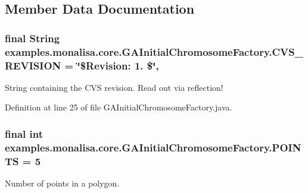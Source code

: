\subsection{Member Data Documentation}
\hypertarget{classexamples_1_1monalisa_1_1core_1_1_g_a_initial_chromosome_factory_a9fccea60730230df75e5bf5a1a209a41}{
\subsubsection[{C\-V\-S\-\_\-\-R\-E\-V\-I\-S\-I\-O\-N}]{\setlength{\rightskip}{0pt plus 5cm}final String examples.\-monalisa.\-core.\-G\-A\-Initial\-Chromosome\-Factory.\-C\-V\-S\-\_\-\-R\-E\-V\-I\-S\-I\-O\-N = \char`\"{}\$Revision\-: 1. \$\char`\"{}\hspace{0.3cm}{\ttfamily [static]}, {\ttfamily [private]}}}\label{classexamples_1_1monalisa_1_1core_1_1_g_a_initial_chromosome_factory_a9fccea60730230df75e5bf5a1a209a41}
String containing the C\-V\-S revision. Read out via reflection! 

Definition at line 25 of file G\-A\-Initial\-Chromosome\-Factory.\-java.

\hypertarget{classexamples_1_1monalisa_1_1core_1_1_g_a_initial_chromosome_factory_af72d5bfb15a860ef43323231eb3eebc2}{
\subsubsection[{P\-O\-I\-N\-T\-S}]{\setlength{\rightskip}{0pt plus 5cm}final int examples.\-monalisa.\-core.\-G\-A\-Initial\-Chromosome\-Factory.\-P\-O\-I\-N\-T\-S = 5\hspace{0.3cm}{\ttfamily [static]}}}\label{classexamples_1_1monalisa_1_1core_1_1_g_a_initial_chromosome_factory_af72d5bfb15a860ef43323231eb3eebc2}
Number of points in a polygon. 

